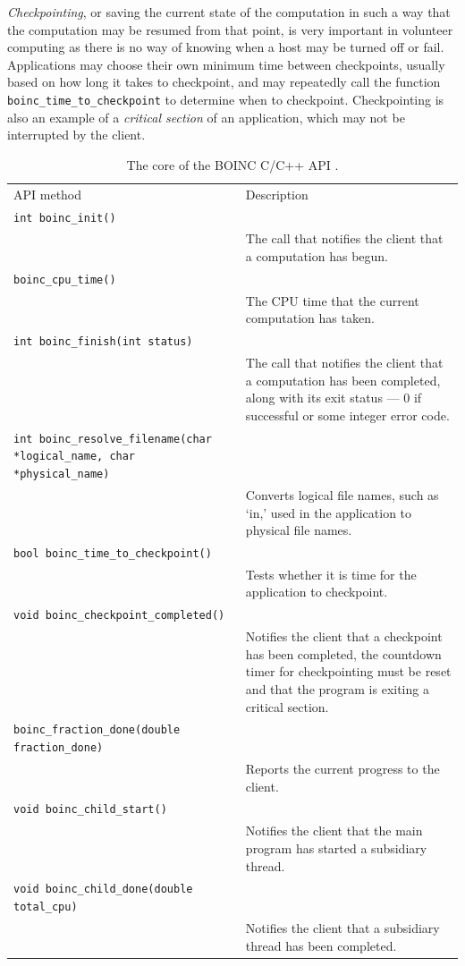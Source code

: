 \emph{Checkpointing}, or saving the current state of the computation in such a way that the computation may be resumed from that point, is very important in volunteer computing as there is no way of knowing when a host may be turned off or fail. Applications may choose their own minimum time between checkpoints, usually based on how long it takes to checkpoint, and may repeatedly call the function \verb|boinc_time_to_checkpoint| to determine when to checkpoint. Checkpointing is also an example of a \emph{critical section} of an application,   which may not be interrupted by the client.
\begin{table}[htb] \centering
\caption{The core of the BOINC C/C++ API \cite{boincwiki}.}
\begin{tabular}{p{2.5cm}p{11.6cm}}\toprule
 API method & Description\\ \cmidrule(r){1-2}
 \verb|int boinc_init()|\\ & The call that notifies the client that a computation has begun.\\
\verb|boinc_cpu_time()| \\ & The CPU time that the current computation has taken.\\
\verb|int boinc_finish(int status)| \\ & The call that notifies the client that a computation has been completed, along with its exit status --- 0 if successful or some integer error code.\\
\verb|int boinc_resolve_filename(char *logical_name, char *physical_name)| \\ & Converts logical file names, such as `in,' used in the application to physical   file names. \\ 
\verb|bool boinc_time_to_checkpoint()| \\ & Tests whether it is time for the application to checkpoint.\\
\verb|void boinc_checkpoint_completed()| \\ & Notifies the client that a checkpoint has been completed, the countdown timer for checkpointing must be reset and that the program is exiting a critical section. 
\\ 
\verb|boinc_fraction_done(double fraction_done)| \\ & Reports the current progress to the client. \\ 
\verb|void boinc_child_start()| \\ & Notifies the client that the main program has started a subsidiary thread.\\
\verb|void boinc_child_done(double total_cpu)| \\ & Notifies the client that   a subsidiary thread has been completed. 
\\ \bottomrule
\end{tabular}\label{tab:api}
\end{table}
 
